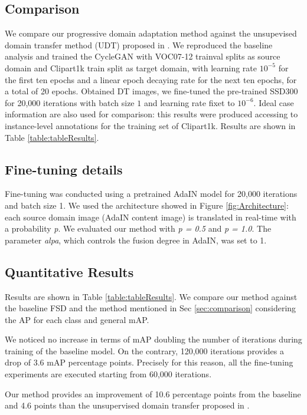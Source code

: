 \documentclass[10pt,twocolumn,letterpaper]{article}
\begin{document}
\subsection{Comparison \label{sec:comparison}}
We compare our progressive domain adaptation method against the unsupevised domain transfer method (UDT) proposed in \cite{CrossDomObjDet}. We reproduced the baseline analysis and trained the CycleGAN with VOC07-12 trainval splits as source domain and Clipart1k train split as target domain, with learning rate \(10^{-5}\) for the first ten epochs and a linear epoch decaying rate for the next ten epochs, for a total of 20 epochs. Obtained DT images, we fine-tuned the pre-trained SSD300 for 20,000 iterations with batch size \(1\) and learning rate fixet to \(10^{-6}\).  Ideal case information are also used for comparison: this results were produced accessing to instance-level annotations for the training set of Clipart1k. Results are shown in Table \ref{table:tableResults}.

\subsection{Fine-tuning details}
Fine-tuning was conducted using a pretrained AdaIN \cite{AdaIN} model for 20,000 iterations and batch size 1. We used the architecture showed in Figure \ref{fig:Architecture}: each source domain image (AdaIN content image) is translated in real-time with a probability {\it p}. We evaluated our method with {\it p = 0.5} and {\it p = 1.0}. The parameter {\it alpa}, which controls the fusion degree in AdaIN, was set to 1.

\subsection{Quantitative Results}
Results are shown in Table \ref{table:tableResults}. We compare our method against the baseline FSD and the method mentioned in Sec \ref{sec:comparison} considering the AP for each class and general mAP.

We noticed no increase in terms of mAP doubling the number of iterations during training of the baseline model. On the contrary, 120,000 iterations provides a drop of 3.6 mAP percentage points. Precisely for this reason, all the fine-tuning experiments are executed starting from 60,000 iterations.

\vspace{3mm}

Our method provides an improvement of 10.6 percentage points from the baseline and 4.6 points than the unsupervised domain transfer proposed in \cite{CrossDomObjDet}. 
\end{document}
